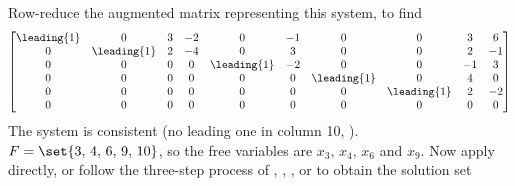 Row-reduce the augmented matrix representing this system, to find
%
\begin{equation*}
\begin{bmatrix}
 \leading{1} & 0 & 3 & -2 & 0 & -1 & 0 & 0 & 3 & 6 \\
 0 & \leading{1} & 2 & -4 & 0 & 3 & 0 & 0 & 2 & -1 \\
 0 & 0 & 0 & 0 & \leading{1} & -2 & 0 & 0 & -1 & 3 \\
 0 & 0 & 0 & 0 & 0 & 0 & \leading{1} & 0 & 4 & 0 \\
 0 & 0 & 0 & 0 & 0 & 0 & 0 & \leading{1} & 2 & -2 \\
 0 & 0 & 0 & 0 & 0 & 0 & 0 & 0 & 0 & 0
\end{bmatrix}
\end{equation*}
%
The system is consistent (no leading one in column 10, ).   $F=\set{3,\,4,\,6,\,9,\,10}$, so the free variables are $x_3,\,x_4,\,x_6$ and $x_9$.  Now apply  directly, or follow the three-step process of , , , or  to obtain the solution set
%

